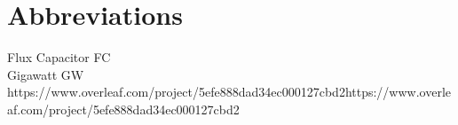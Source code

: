 
\section*{Abbreviations}
\large 
Flux Capacitor \hfill FC\\
Gigawatt \hfill GW\\

https://www.overleaf.com/project/5efe888dad34ec000127cbd2https://www.overleaf.com/project/5efe888dad34ec000127cbd2